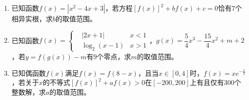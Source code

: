 \begin{que}
	\begin{enumerate}
		\item 已知函数$f(x)=|x^2-4x+3|$，若方程$[f(x)]^2+bf(x)+c=0$恰有$7$个相异实根，求$b$的取值范围。
		\item 已知函数$f(x)=\left\{\begin{aligned}&|2x+1|&x<1\\&\log_2{(x-1)}&x>1\end{aligned}\right.$，$g(x)=\dfrac{5}{4}x^3-\dfrac{15}{4}x^2+m+2$，若$y=f(g(x))-m$有$9$个零点，求$m$的取值范围。
		\item 已知偶函数$f(x)$满足$f(x)=f(8-x)$，且当$x\in[0,4]$时，$f(x)=xe^{-\frac{x}{2}}$，若关于$x$的不等式$[f(x)]^2+af(x)>0$在$[-200,200]$上有且仅有$300$个整数解，求$a$的取值范围。
	\end{enumerate}
\end{que}
